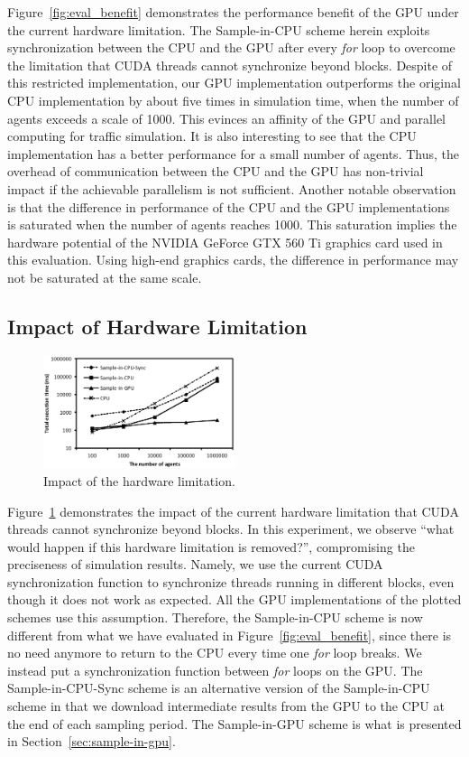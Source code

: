 \documentclass[times, 10pt, twocolumn]{article}
\begin{document}
Figure~\ref{fig:eval_benefit} demonstrates the performance benefit of
the GPU under the current hardware limitation.
The Sample-in-CPU scheme herein exploits synchronization between the CPU
and the GPU after every \textit{for} loop to overcome the limitation that
CUDA threads cannot synchronize beyond blocks.
Despite of this restricted implementation, our GPU implementation
outperforms the original CPU implementation by about five times in
simulation time, when the number of agents exceeds a scale of 1000.
This evinces an affinity of the GPU and parallel computing for traffic
simulation.
It is also interesting to see that the CPU implementation has a better
performance for a small number of agents.
Thus, the overhead of communication between the CPU and the GPU has
non-trivial impact if the achievable parallelism is not sufficient.
Another notable observation is that the difference in performance of the
CPU and the GPU implementations is saturated when the number of agents
reaches 1000.
This saturation implies the hardware potential of the NVIDIA GeForce GTX
560 Ti graphics card used in this evaluation.
Using high-end graphics cards, the difference in performance may not be
saturated at the same scale.

\subsection{Impact of Hardware Limitation}

\begin{figure}[t]
\centering
\includegraphics[width=0.5\textwidth]{eps/eval_nosync.eps}
\caption{Impact of the hardware limitation.}
\label{fig:eval_nosync}
\end{figure}

Figure~\ref{fig:eval_nosync} demonstrates the impact of the current
hardware limitation that CUDA threads cannot synchronize beyond blocks.
In this experiment, we observe ``what would happen if this hardware
limitation is removed?'', compromising the preciseness of simulation
results.
Namely, we use the current CUDA synchronization function to synchronize
threads running in different blocks, even though it does not work as
expected.
All the GPU implementations of the plotted schemes use this assumption.
Therefore, the Sample-in-CPU scheme is now different from what we have
evaluated in Figure~\ref{fig:eval_benefit}, since there is no need
anymore to return to the CPU every time one \textit{for} loop breaks.
We instead put a synchronization function between \textit{for} loops on
the GPU.
The Sample-in-CPU-Sync scheme is an alternative version of the
Sample-in-CPU scheme in that we download intermediate results from the
GPU to the CPU at the end of each sampling period.
The Sample-in-GPU scheme is what is presented in
Section~\ref{sec:sample-in-gpu}.
\end{document}

